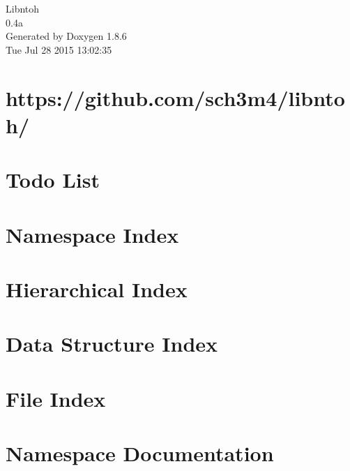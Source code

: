 \documentclass[twoside]{book}
\newcommand{\clearemptydoublepage}{%
  \newpage{\pagestyle{empty}\cleardoublepage}%
}
\begin{document}
\hypersetup{pageanchor=false}
\begin{titlepage}
\vspace*{7cm}
\begin{center}%
{\Large Libntoh \\[1ex]\large 0.\-4a }\\
\vspace*{1cm}
{\large Generated by Doxygen 1.8.6}\\
\vspace*{0.5cm}
{\small Tue Jul 28 2015 13:02:35}\\
\end{center}
\end{titlepage}
\clearemptydoublepage
\tableofcontents
\clearemptydoublepage
{}
\hypersetup{pageanchor=true}

\chapter{https\-://github.com/sch3m4/libntoh/}
\label{index}\hypertarget{index}{}
\chapter{Todo List}
\label{todo}
\hypertarget{todo}{}

\chapter{Namespace Index}

\chapter{Hierarchical Index}

\chapter{Data Structure Index}

\chapter{File Index}

\chapter{Namespace Documentation}

\end{document}
